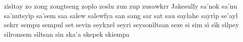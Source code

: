zìsìtay\hspace{2mm}
zo\hspace{2mm}
zong\hspace{2mm}
zongtseng\hspace{2mm}
zoplo\hspace{2mm}
zoslu\hspace{2mm}
zun\hspace{2mm}
zup\hspace{2mm}
zusawkrr\hspace{2mm}
Jakesully\hspace{2mm}
sa'nok\hspace{2mm}
sa'nu\hspace{2mm}
sa'nutsyìp\hspace{2mm}
sa'sem\hspace{2mm}
saa\hspace{2mm}
salew\hspace{2mm}
salewfya\hspace{2mm}
san\hspace{2mm}
sang\hspace{2mm}
sar\hspace{2mm}
sat\hspace{2mm}
sau\hspace{2mm}
saylahe\hspace{2mm}
sayrìp\hspace{2mm}
se'ayl\hspace{2mm}
sekrr\hspace{2mm}
sempu\hspace{2mm}
sempul\hspace{2mm}
set\hspace{2mm}
sevin\hspace{2mm}
seykxel\hspace{2mm}
seyri\hspace{2mm}
seysonìltsan\hspace{2mm}
seze\hspace{2mm}
si\hspace{2mm}
sim\hspace{2mm}
sì\hspace{2mm}
sìk\hspace{2mm}
sìlpey\hspace{2mm}
sìlronsem\hspace{2mm}
sìltsan\hspace{2mm}
sìn\hspace{2mm}
ska'a\hspace{2mm}
skepek\hspace{2mm}
skiempa\hspace{2mm}
